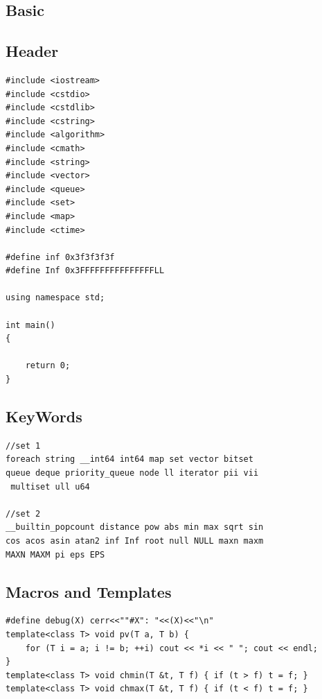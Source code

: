 \documentclass[twocolumn]{article}
\begin{document}
\clearpage
\begin{twocolumn}
\tableofcontents
\clearpage %



\section{Basic}

\subsection{Header}
\begin{lstlisting}[language={[ANSI]C}]
#include <iostream>
#include <cstdio>
#include <cstdlib>
#include <cstring>
#include <algorithm>
#include <cmath>
#include <string>
#include <vector>
#include <queue>
#include <set>
#include <map>
#include <ctime>

#define inf 0x3f3f3f3f
#define Inf 0x3FFFFFFFFFFFFFFFLL

using namespace std;

int main()
{

    return 0;
}
\end{lstlisting}

\subsection{KeyWords}
\begin{lstlisting}[language={[ANSI]C}]
//set 1
foreach string __int64 int64 map set vector bitset
queue deque priority_queue node ll iterator pii vii
 multiset ull u64

//set 2
__builtin_popcount distance pow abs min max sqrt sin
cos acos asin atan2 inf Inf root null NULL maxn maxm
MAXN MAXM pi eps EPS
\end{lstlisting}



\subsection{Macros and Templates}
\begin{lstlisting}[language={[ANSI]C}]
#define debug(X) cerr<<""#X": "<<(X)<<"\n"
template<class T> void pv(T a, T b) {
    for (T i = a; i != b; ++i) cout << *i << " "; cout << endl;
}
template<class T> void chmin(T &t, T f) { if (t > f) t = f; }
template<class T> void chmax(T &t, T f) { if (t < f) t = f; }
\end{lstlisting}




\end{twocolumn}
\end{document}
